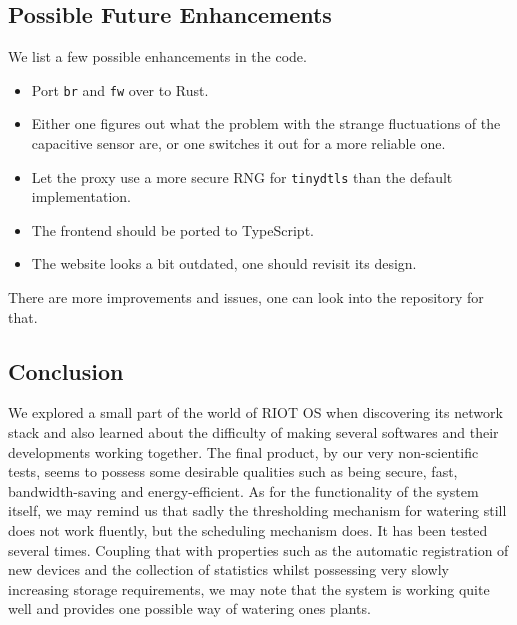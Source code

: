 \documentclass[acmtog, language=english, nonacm]{acmart}
\begin{document}
    \subsection{Possible Future Enhancements}

    We list a few possible enhancements in the code.
    \begin{itemize}
        \item Port \texttt{br} and \texttt{fw} over to Rust.
        \item Either one figures out what the problem with the strange fluctuations of the capacitive sensor are, or one switches it out for a more reliable one.
        \item Let the proxy use a more secure RNG for \texttt{tinydtls} than the default implementation.
        \item The frontend should be ported to TypeScript.
        \item The website looks a bit outdated, one should revisit its design.
    \end{itemize}
    There are more improvements and issues, one can look into the repository for that.

    \subsection{Conclusion}

    We explored a small part of the world of RIOT OS when discovering its network stack and also learned about the difficulty of making several softwares and their developments working together. The final product, by our very non-scientific tests, seems to possess some desirable qualities such as being secure, fast, bandwidth-saving and energy-efficient. As for the functionality of the system itself, we may remind us that sadly the thresholding mechanism for watering still does not work fluently, but the scheduling mechanism does. It has been tested several times. Coupling that with properties such as the automatic registration of new devices and the collection of statistics whilst possessing very slowly increasing storage requirements, we may note that the system is working quite well and provides one possible way of watering ones plants.

    
    

\end{document}
